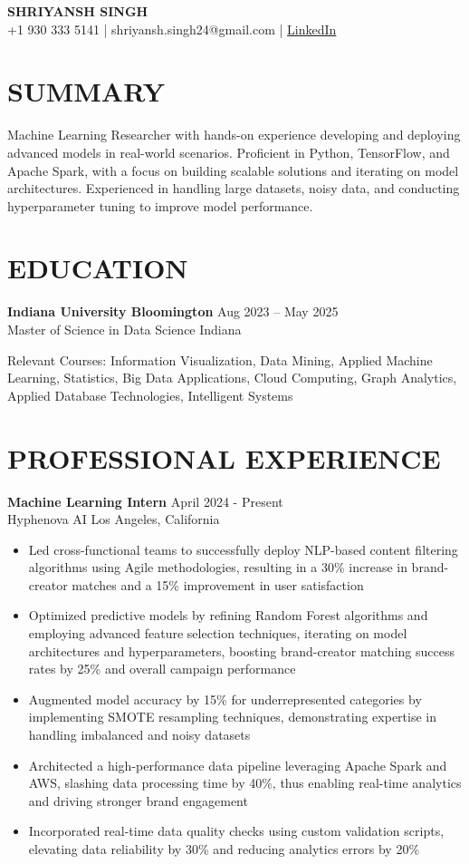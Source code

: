 \documentclass[12pt,a4paper]{article}
\newcommand{\cvitem}[4]{
  \textbf{#1} \hfill #2\\
  #3 \hfill #4 \par\vspace{-0.5em} %
}
\newcommand{\workexp}[4]{
  \textbf{#1} \hfill #2\\
  #3 \hfill #4\\
  \vspace{-1em} %
}
\begin{document}
\begin{center}
\textbf{\LARGE SHRIYANSH SINGH}\\
\normalsize
+1 930 333 5141 | shriyansh.singh24@gmail.com | \href{https://www.linkedin.com/in/shriyansh-bir-singh}{LinkedIn} 
\end{center}

\section*{SUMMARY}
Machine Learning Researcher with hands-on experience developing and deploying advanced models in real-world scenarios. Proficient in Python, TensorFlow, and Apache Spark, with a focus on building scalable solutions and iterating on model architectures. Experienced in handling large datasets, noisy data, and conducting hyperparameter tuning to improve model performance.

\section*{EDUCATION}
\cvitem{Indiana University Bloomington}{Aug 2023 – May 2025}{Master of Science in Data Science}{Indiana}
\textnormal{Relevant Courses:} Information Visualization, Data Mining, Applied Machine Learning, Statistics, Big Data Applications, Cloud Computing, Graph Analytics, Applied Database Technologies, Intelligent Systems

\section*{PROFESSIONAL EXPERIENCE}
\workexp{Machine Learning Intern}{April 2024 - Present}{Hyphenova AI}{Los Angeles, California}
\begin{itemize}[leftmargin=*,noitemsep,topsep=0pt]
\item Led cross-functional teams to successfully deploy NLP-based content filtering algorithms using Agile methodologies, resulting in a 30\% increase in brand-creator matches and a 15\% improvement in user satisfaction
\item Optimized predictive models by refining Random Forest algorithms and employing advanced feature selection techniques, iterating on model architectures and hyperparameters, boosting brand-creator matching success rates by 25\% and overall campaign performance
\item Augmented model accuracy by 15\% for underrepresented categories by implementing SMOTE resampling techniques, demonstrating expertise in handling imbalanced and noisy datasets
\item Architected a high-performance data pipeline leveraging Apache Spark and AWS, slashing data processing time by 40\%, thus enabling real-time analytics and driving stronger brand engagement
\item Incorporated real-time data quality checks using custom validation scripts, elevating data reliability by 30\% and reducing analytics errors by 20\%
\end{itemize}
\end{document}
